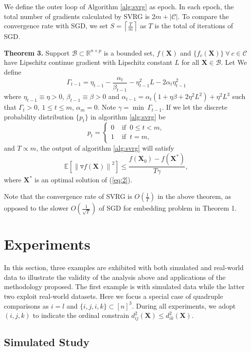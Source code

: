 \documentclass[letterpaper]{article}
\newcommand{\qqxu}[1]{\textcolor[rgb]{0.00,1.00,0.00}{#1}}
\begin{document}
		We define the outer loop of Algorithm \ref{alg:svrg} as epoch. In each epoch, the total number of gradients calculated by SVRG is $2m+|\mathcal{C}|$. To compare the convergence rate with SGD, we set $S = \left \lceil \frac{T}{m} \right \rceil$ as $T$ is the total of iterations of SGD.

		\textbf{Theorem 3.} Support $\mathcal{B}\subset\mathbb{R}^{n\times p}$ is a bounded set, $f(\mathbf{X})$ and $\{f_c(\mathbf{X})\}\ \forall\ c\in\mathcal{C}$ have Lipschitz continue gradient with Lipschitz constant $L$ for all $\mathbf{X}\in\mathcal{B}$. Let We define
		$$
		\Gamma_{t-1} = \eta_{t-1}-\frac{\alpha_{t}}{\beta_{t-1}}-\eta^2_{t-1}L-2\alpha_{t}\eta^2_{t-1}
		$$
		where $\eta_{t-1}\equiv\eta>0$, $\beta_{t-1}\equiv\beta>0$ and $\alpha_{t-1}=\alpha_{t}(1+\eta\beta+2\eta^2L^2)+\eta^2L^3$ such that $\Gamma_t>0,\  1\leq t\leq m$, $\alpha_m=0$. Note $\gamma=\min\ \Gamma_{t-1}$. If we let the discrete probability distribution  $\{p_t\}$ in algorithm \ref{alg:svrg} be
		$$
		p_t=
		\begin{cases}
			0 & \text{ if }\ 0\leq t < m, \\
			1 & \text{ if }\ t = m,
		\end{cases}
		$$
		and $T\propto m$, the output of algorithm \ref{alg:svrg} will satisfy
		$$
			\mathbb{E}\left[\left\|\triangledown f(\mathbf{X})\right\|^2\right]\leq \frac{f(\mathbf{X}_0)-f(\mathbf{X}^*)}{T\gamma},
		$$
		where $\mathbf{X}^*$ is an optimal solution of (\ref{eq:2}).

		Note that the convergence rate of SVRG is $O(\frac{1}{T})$ in the above theorem, as opposed to the slower $O(\frac{1}{\sqrt{T}})$ of SGD for embedding problem in Theorem 1.

		\section{Experiments}

		\qqxu{In this section, three examples are exhibited with both simulated and real-world data to illustrate the validity of the analysis above and applications of the methodology proposed. The first example is with simulated data while the latter two exploit real-world datasets.} Here we focus a special case of quadruple comparisons as $i=l$ and $\{i,j,i,k\}\subset[n]^3$. During all experiments, we \qqxu{adopt} $(i,j,k)$ to indicate the ordinal constrain $d^2_{ij}(\mathbf{X})\leq d^2_{ik}(\mathbf{X})$. 

		\subsection{Simulated Study}
\end{document}
